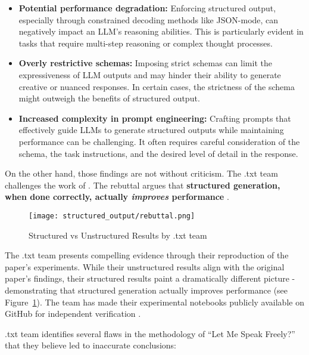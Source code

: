 \begin{itemize}
    \item \textbf{Potential performance degradation:} Enforcing structured output, especially through constrained decoding methods like JSON-mode, can negatively impact an LLM's reasoning abilities. This is particularly evident in tasks that require multi-step reasoning or complex thought processes.
    
    \item \textbf{Overly restrictive schemas:} Imposing strict schemas can limit the expressiveness of LLM outputs and may hinder their ability to generate creative or nuanced responses. In certain cases, the strictness of the schema might outweigh the benefits of structured output.
    
    \item \textbf{Increased complexity in prompt engineering:} Crafting prompts that effectively guide LLMs to generate structured outputs while maintaining performance can be challenging. It often requires careful consideration of the schema, the task instructions, and the desired level of detail in the response.
\end{itemize}

On the other hand, those findings are not without criticism. The .txt team challenges the work of . The rebuttal argues that \textbf{structured generation, when done correctly, actually \textit{improves} performance} .

\begin{figure}[h]
\centering
\texttt{[image: structured\_output/rebuttal.png]}
\caption{Structured vs Unstructured Results by .txt team \cite{dottxt2024demos}}
\label{structured_vs_unstructured}
\end{figure}

The .txt team presents compelling evidence through their reproduction of the paper's experiments. While their unstructured results align with the original paper's findings, their structured results paint a dramatically different picture - demonstrating that structured generation actually improves performance (see Figure~\ref{structured_vs_unstructured}). The team has made their experimental notebooks publicly available on GitHub for independent verification .

.txt team identifies several flaws in the methodology of ``Let Me Speak Freely?'' that they believe led to inaccurate conclusions:

